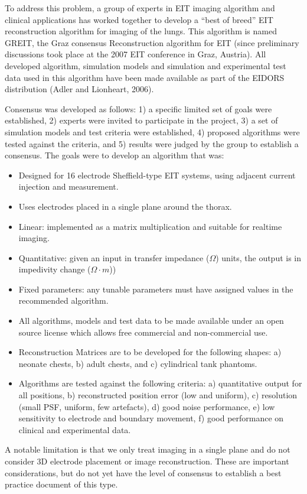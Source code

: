 \documentclass[letterpaper,twocolumn,11pt]{article}
\begin{document}
To address this problem, a group of experts in EIT imaging
algorithm and clinical applications has worked together to
develop a ``best of breed'' EIT reconstruction algorithm
for imaging of the lungs. This algorithm is named GREIT, 
the Graz consensus Reconstruction algorithm for EIT (since
preliminary discussions took place at the 2007 EIT conference
in Graz, Austria). All developed algorithm, simulation
models and simulation and experimental test data used
in this algorithm have been made available as part of
the EIDORS distribution (Adler and Lionheart, 2006).

Consensus was developed as follows: 1) a specific limited
set of goals were established, 2) experts were invited
to participate in the project, 3) a set of simulation models
and test criteria were established, 4) proposed algorithms
were tested against the criteria, and 5) results were judged
by the group to establish a consensus.
The goals were to develop an algorithm that was:
\begin{itemize}
\item Designed for 16 electrode Sheffield-type EIT systems, using
      adjacent current injection and measurement.
\item Uses electrodes placed in a single plane around the thorax.
\item Linear: implemented as a matrix multiplication and suitable
              for realtime imaging.
\item Quantitative: given an input in transfer impedance ($\Omega$) units,
                    the output is in impedivity change ($\Omega\cdot m$))
\item Fixed parameters: any tunable parameters must have assigned
                    values in the recommended algorithm.
\item All algorithms, models and test data to be made available
                    under an open source license which allows
                    free commercial and non-commercial use.
\item Reconstruction Matrices are to be developed for the
      following shapes:
   a) neonate chests, 
   b) adult chests, and 
   c) cylindrical tank phantoms.
\item Algorithms are tested against the following criteria:
    a) quantitative output for all positions,
    b) reconstructed position error (low and uniform),
    c) resolution (small PSF, uniform, few artefacts),
    d) good noise performance,
    e) low sensitivity to electrode and boundary movement,
    f) good performance on clinical and experimental data.
\end{itemize}
A notable limitation is that we only treat imaging in
a single plane and do not consider 3D electrode placement or
image reconstruction. These are important considerations, but
do not yet have the level of consensus to establish a best
practice document of this type.
\end{document}
